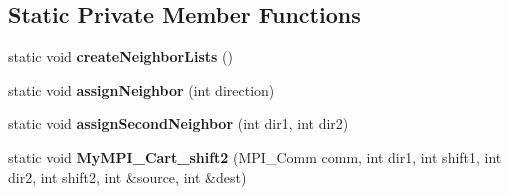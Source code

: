 \subsection*{Static Private Member Functions}
\begin{DoxyCompactItemize}
\item 
static void {\bfseries create\+Neighbor\+Lists} ()\hypertarget{classParallel_a0bc2faea05d1a899d71fa5a29c13cd4a}{}\label{classParallel_a0bc2faea05d1a899d71fa5a29c13cd4a}

\item 
static void {\bfseries assign\+Neighbor} (int direction)\hypertarget{classParallel_a246c14b38e3852f2f97458634cd01391}{}\label{classParallel_a246c14b38e3852f2f97458634cd01391}

\item 
static void {\bfseries assign\+Second\+Neighbor} (int dir1, int dir2)\hypertarget{classParallel_a14545f7fc9d73b2a5decd609585ef6ea}{}\label{classParallel_a14545f7fc9d73b2a5decd609585ef6ea}

\item 
static void {\bfseries My\+M\+P\+I\+\_\+\+Cart\+\_\+shift2} (M\+P\+I\+\_\+\+Comm comm, int dir1, int shift1, int dir2, int shift2, int \&source, int \&dest)\hypertarget{classParallel_a5a5e5ad59586bb545aa3840991b20af8}{}\label{classParallel_a5a5e5ad59586bb545aa3840991b20af8}

\end{DoxyCompactItemize}
